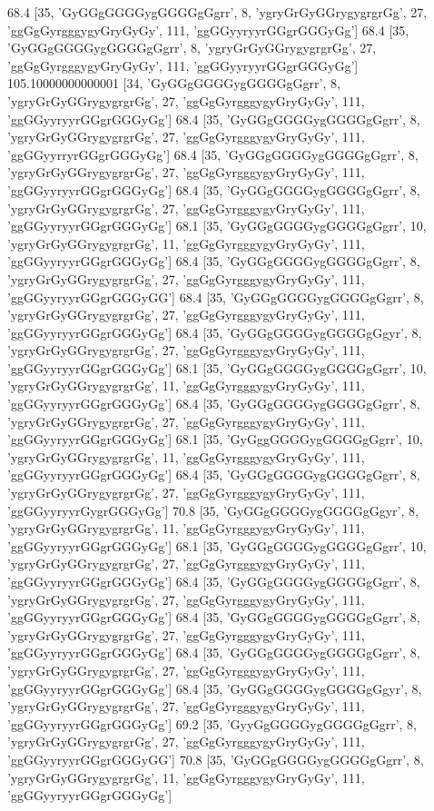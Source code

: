 68.4 [35, 'GyGGgGGGGygGGGGgGgrr', 8, 'ygryGrGyGGrygygrgrGg', 27, 'ggGgGyrgggygyGryGyGy', 111, 'ggGGyyryyrGGgrGGGyGg']
68.4 [35, 'GyGGgGGGGygGGGGgGgrr', 8, 'ygryGrGyGGrygygrgrGg', 27, 'ggGgGyrgggygyGryGyGy', 111, 'ggGGyyryyrGGgrGGGyGg']
105.10000000000001 [34, 'GyGGgGGGGygGGGGgGgrr', 8, 'ygryGrGyGGrygygrgrGg', 27, 'ggGgGyrgggygyGryGyGy', 111, 'ggGGyyryyrGGgrGGGyGg']
68.4 [35, 'GyGGgGGGGygGGGGgGgrr', 8, 'ygryGrGyGGrygygrgrGg', 27, 'ggGgGyrgggygyGryGyGy', 111, 'ggGGyyrryrGGgrGGGyGg']
68.4 [35, 'GyGGgGGGGygGGGGgGgrr', 8, 'ygryGrGyGGrygygrgrGg', 27, 'ggGgGyrgggygyGryGyGy', 111, 'ggGGyyryyrGGgrGGGyGg']
68.4 [35, 'GyGGgGGGGygGGGGgGgrr', 8, 'ygryGrGyGGrygygrgrGg', 27, 'ggGgGyrgggygyGryGyGy', 111, 'ggGGyyryyrGGgrGGGyGg']
68.1 [35, 'GyGGgGGGGygGGGGgGgrr', 10, 'ygryGrGyGGrygygrgrGg', 11, 'ggGgGyrgggygyGryGyGy', 111, 'ggGGyyryyrGGgrGGGyGg']
68.4 [35, 'GyGGgGGGGygGGGGgGgrr', 8, 'ygryGrGyGGrygygrgrGg', 27, 'ggGgGyrgggygyGryGyGy', 111, 'ggGGyyryyrGGgrGGGyGG']
68.4 [35, 'GyGGgGGGGygGGGGgGgrr', 8, 'ygryGrGyGGrygygrgrGg', 27, 'ggGgGyrgggygyGryGyGy', 111, 'ggGGyyryyrGGgrGGGyGg']
68.4 [35, 'GyGGgGGGGygGGGGgGgyr', 8, 'ygryGrGyGGrygygrgrGg', 27, 'ggGgGyrgggygyGryGyGy', 111, 'ggGGyyryyrGGgrGGGyGg']
68.1 [35, 'GyGGgGGGGygGGGGgGgrr', 10, 'ygryGrGyGGrygygrgrGg', 11, 'ggGgGyrgggygyGryGyGy', 111, 'ggGGyyryyrGGgrGGGyGg']
68.4 [35, 'GyGGgGGGGygGGGGgGgrr', 8, 'ygryGrGyGGrygygrgrGg', 27, 'ggGgGyrgggygyGryGyGy', 111, 'ggGGyyryyrGGgrGGGyGg']
68.1 [35, 'GyGggGGGGygGGGGgGgrr', 10, 'ygryGrGyGGrygygrgrGg', 11, 'ggGgGyrgggygyGryGyGy', 111, 'ggGGyyryyrGGgrGGGyGg']
68.4 [35, 'GyGGgGGGGygGGGGgGgrr', 8, 'ygryGrGyGGrygygrgrGg', 27, 'ggGgGyrgggygyGryGyGy', 111, 'ggGGyyryyrGygrGGGyGg']
70.8 [35, 'GyGGgGGGGygGGGGgGgyr', 8, 'ygryGrGyGGrygygrgrGg', 11, 'ggGgGyrgggygyGryGyGy', 111, 'ggGGyyryyrGGgrGGGyGg']
68.1 [35, 'GyGGgGGGGygGGGGgGgrr', 10, 'ygryGrGyGGrygygrgrGg', 27, 'ggGgGyrgggygyGryGyGy', 111, 'ggGGyyryyrGGgrGGGyGg']
68.4 [35, 'GyGGgGGGGygGGGGgGgrr', 8, 'ygryGrGyGGrygygrgrGg', 27, 'ggGgGyrgggygyGryGyGy', 111, 'ggGGyyryyrGGgrGGGyGg']
68.4 [35, 'GyGGgGGGGygGGGGgGgrr', 8, 'ygryGrGyGGrygygrgrGg', 27, 'ggGgGyrgggygyGryGyGy', 111, 'ggGGyyryyrGGgrGGGyGg']
68.4 [35, 'GyGGgGGGGygGGGGgGgrr', 8, 'ygryGrGyGGrygygrgrGg', 27, 'ggGgGyrgggygyGryGyGy', 111, 'ggGGyyryyrGGgrGGGyGg']
68.4 [35, 'GyGGgGGGGygGGGGgGgyr', 8, 'ygryGrGyGGrygygrgrGg', 27, 'ggGgGyrgggygyGryGyGy', 111, 'ggGGyyryyrGGgrGGGyGg']
69.2 [35, 'GyyGgGGGGygGGGGgGgrr', 8, 'ygryGrGyGGrygygrgrGg', 27, 'ggGgGyrgggygyGryGyGy', 111, 'ggGGyyryyrGGgrGGGyGG']
70.8 [35, 'GyGGgGGGGygGGGGgGgrr', 8, 'ygryGrGyGGrygygrgrGg', 11, 'ggGgGyrgggygyGryGyGy', 111, 'ggGGyyryyrGGgrGGGyGg']
